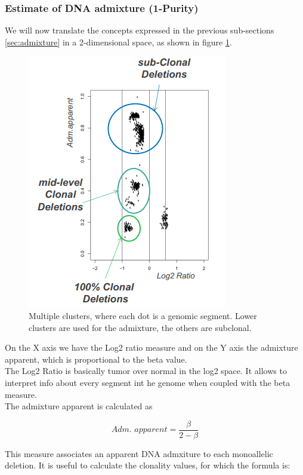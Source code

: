 \subsubsection{Estimate of DNA admixture (1-Purity)}
We will now translate the concepts expressed in the previous sub-sections \ref{sec:admixture} in a 2-dimensional space, as shown in figure \ref{fig:2d}.

\begin{figure}
	\includegraphics[width=0.7\linewidth]{adm.png}
	\caption{Multiple clusters, where each dot is a genomic segment. Lower clusters are used for the admixture, the others are subclonal.}
 \label{fig:2d}
\end{figure}

On the X axis we have the Log2 ratio measure and on the Y axis the admixture apparent, which is proportional to the beta  value.\\
The Log2 Ratio is basically tumor over normal in the log2 space. It allows to interpret info about every segment int he genome when coupled with the beta measure.
\\
The admixture apparent is calculated as 

\begin{equation} \label{eq:adm}
\textit{Adm. apparent} = \frac{\beta}{2-\beta}
\end{equation}

This measure associates an apparent DNA admxiture to each monoallelic deletion. It is useful to calculate the clonality values, for which the formula is: 

